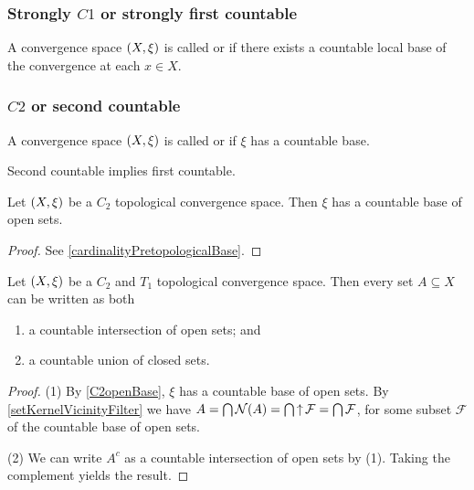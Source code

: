 \subsubsection{Strongly $C1$ or strongly first countable}
\begin{definition}
A convergence space $\sSet{X, \xi}$ is called  or  if there exists a countable local base of the convergence at each $x\in X$.
\end{definition}

\subsubsection{$C2$ or second countable}
\begin{definition}
A convergence space $\sSet{X, \xi}$ is called  or  if $\xi$ has a countable base.
\end{definition}

\begin{lemma}
Second countable implies first countable.
\end{lemma}

\begin{lemma} \label{C2openBase}
Let $\sSet{X,\xi}$ be a $C_2$ topological convergence space. Then $\xi$ has a countable base of open sets.
\end{lemma}
\begin{proof}
See \ref{cardinalityPretopologicalBase}.
\end{proof}

\begin{lemma} \label{AnySetCountableIntersectionOfOpenSets}
Let $\sSet{X,\xi}$ be a $C_2$ and $T_1$ topological convergence space. Then every set $A\subseteq X$ can be written as both
\begin{enumerate}
\item a countable intersection of open sets; and
\item a countable union of closed sets.
\end{enumerate}
\end{lemma}
\begin{proof}
(1) By \ref{C2openBase}, $\xi$ has a countable base of open sets. By \ref{setKernelVicinityFilter} we have $A = \bigcap \operatorname{\mathcal{N}}(A) = \bigcap \operatorname{\uparrow} \mathcal{F} = \bigcap \mathcal{F}$, for some subset $\mathcal{F}$ of the countable base of open sets.

(2) We can write $A^c$ as a countable intersection of open sets by (1). Taking the complement yields the result.
\end{proof}


